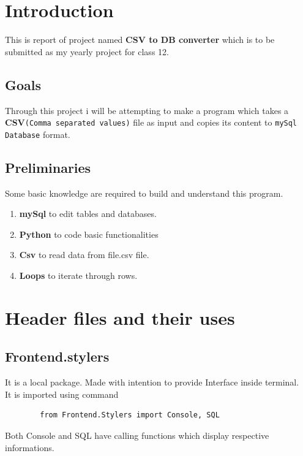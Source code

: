 \documentclass[12pt,a4paper]{report}
\begin{document}


\newpage

    \tableofcontents

\newpage


    \chapter{Introduction}
	\vspace{1cm}
    This is report of project named \textbf{CSV to DB converter} which is to be submitted as my yearly project for class 12.
        \section{Goals}
        Through this project i will be attempting to make a program which takes a \textbf{CSV}\texttt{(Comma separated values)} file as input and copies its content to \texttt{mySql Database} format.\\
        \section{Preliminaries}
        Some basic knowledge are required to build and understand this program.
        \begin{enumerate}
            \item \textbf{mySql} to edit tables and databases.
            \item \textbf{Python} to code basic functionalities
            \item \textbf{Csv} to read data from file.csv file.
            \item \textbf{Loops} to iterate through rows.
        \end{enumerate}
 
\newpage
	
    \chapter{Header files and their uses} 
        \vspace{.6cm}
        \section{Frontend.stylers}
        It is a local package. Made with intention to provide Interface inside terminal.\\
        It is imported using command
        \begin{verbatim}
        from Frontend.Stylers import Console, SQL
        \end{verbatim}
        Both Console and SQL have calling functions which display respective informations.
\end{document}

